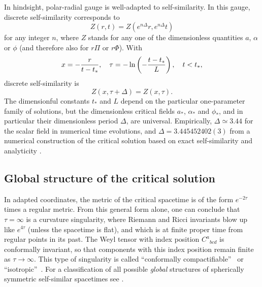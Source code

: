 \documentclass{article}
\begin{document}
In hindsight, polar-radial gauge is well-adapted to
self-similarity. In this gauge, discrete self-similarity corresponds
to
%
\begin{equation}
  \label{tr_scaling}
  Z(r, t) = Z\left(e^{n\Delta}r, e^{n\Delta}t\right)
\end{equation}
%
for any integer $n$, where $Z$ stands for any one of the
dimensionless quantities $a$, $\alpha$ or
$\phi$ (and therefore also for $r\Pi$ or $r\Phi$). With 
%
\begin{equation}
  \label{x_tau}
  x = -{r \over t-t_*}, \quad \tau = - \ln\left(-{t-t_*\over
  L}\right), \quad t<t_*,
\end{equation}
%
discrete self-similarity is
%
\begin{equation}
  Z(x,\tau+\Delta) = Z(x,\tau).
\end{equation}
%
The dimensionful constants $t_*$ and $L$ depend on the particular
one-parameter family of solutions, but the dimensionless critical
fields $a_*$, $\alpha_*$ and $\phi_*$, and in particular their
dimensionless period $\Delta$, are universal. Empirically,
$\Delta\simeq 3.44$ for the scalar field in numerical time evolutions,
and $\Delta=3.445452402(3)$ from a numerical construction of the
critical solution based on exact self-similarity and analyticity
\cite{critcont}.


\subsection{Global structure of the critical solution}
\label{section:globalstructure}

In adapted coordinates, the metric of the critical spacetime is of the
form $e^{-2\tau}$ times a regular metric. From this general form
alone, one can conclude that $\tau=\infty$ is a curvature singularity,
where Riemann and Ricci invariants blow up like $e^{4\tau}$ (unless
the spacetime is flat), and which is at finite proper time from
regular points in its past.  The Weyl tensor with index position
${C^a}_{bcd}$ is conformally invariant, so that components with this
index position remain finite as $\tau\to\infty$. This type of
singularity is called ``conformally compactifiable''~\cite{Tod_pc} or
``isotropic''~\cite{Goodeetal}. For a classification of all possible
{\em global} structures of spherically symmetric self-similar spacetimes see
\cite{GundlachMartinCSS}.
\end{document}
